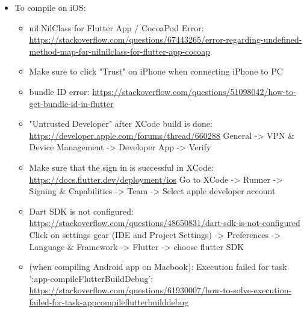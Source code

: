 \documentclass[a4paper]{scrreprt}
\begin{document}
\begin{itemize}
    \item To compile on iOS:
    \begin{itemize}
        \item nil:NilClass for Flutter App / CocoaPod Error:
        \url{https://stackoverflow.com/questions/67443265/error-regarding-undefined-method-map-for-nilnilclass-for-flutter-app-cocoap}
        \item Make sure to click "Trust" on iPhone when connecting iPhone to PC
        \item bundle ID error:
        \url{https://stackoverflow.com/questions/51098042/how-to-get-bundle-id-in-flutter}
        \item "Untrusted Developer" after XCode build is done:
        \url{https://developer.apple.com/forums/thread/660288}
        General -> VPN \& Device Management -> Developer App -> Verify
        \item Make sure that the sign in is successful in XCode:
        \url{https://docs.flutter.dev/deployment/ios}
        Go to XCode -> Runner -> Signing \& Capabilities -> Team -> Select apple developer account
        \item Dart SDK is not configured:
        \url{https://stackoverflow.com/questions/48650831/dart-sdk-is-not-configured}
        Click on settings gear (IDE and Project Settings) -> Preferences -> Language \& Framework -> Flutter -> choose flutter SDK
        \item (when compiling Android app on Macbook): Execution failed for task ':app-compileFlutterBuildDebug':
        \url{https://stackoverflow.com/questions/61930007/how-to-solve-execution-failed-for-task-appcompileflutterbuilddebug}
    \end{itemize}
\end{itemize}
\end{document}
